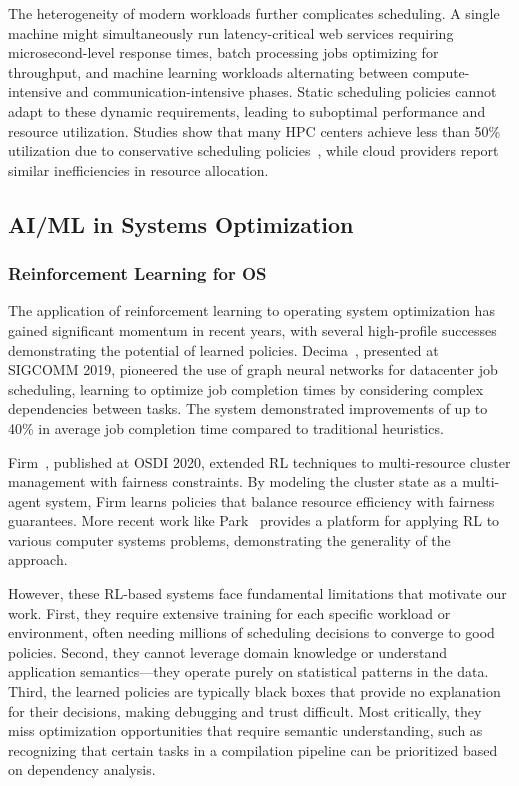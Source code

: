 The heterogeneity of modern workloads further complicates scheduling. A single machine might simultaneously run latency-critical web services requiring microsecond-level response times, batch processing jobs optimizing for throughput, and machine learning workloads alternating between compute-intensive and communication-intensive phases. Static scheduling policies cannot adapt to these dynamic requirements, leading to suboptimal performance and resource utilization. Studies show that many HPC centers achieve less than 50\% utilization due to conservative scheduling policies~\cite{feitelson2023utilization}, while cloud providers report similar inefficiencies in resource allocation.

\subsection{AI/ML in Systems Optimization}

\subsubsection{Reinforcement Learning for OS}

The application of reinforcement learning to operating system optimization has gained significant momentum in recent years, with several high-profile successes demonstrating the potential of learned policies. Decima~\cite{mao2019decima}, presented at SIGCOMM 2019, pioneered the use of graph neural networks for datacenter job scheduling, learning to optimize job completion times by considering complex dependencies between tasks. The system demonstrated improvements of up to 40\% in average job completion time compared to traditional heuristics.

Firm~\cite{qiu2020firm}, published at OSDI 2020, extended RL techniques to multi-resource cluster management with fairness constraints. By modeling the cluster state as a multi-agent system, Firm learns policies that balance resource efficiency with fairness guarantees. More recent work like Park~\cite{mao2019park} provides a platform for applying RL to various computer systems problems, demonstrating the generality of the approach.

However, these RL-based systems face fundamental limitations that motivate our work. First, they require extensive training for each specific workload or environment, often needing millions of scheduling decisions to converge to good policies. Second, they cannot leverage domain knowledge or understand application semantics—they operate purely on statistical patterns in the data. Third, the learned policies are typically black boxes that provide no explanation for their decisions, making debugging and trust difficult. Most critically, they miss optimization opportunities that require semantic understanding, such as recognizing that certain tasks in a compilation pipeline can be prioritized based on dependency analysis.

